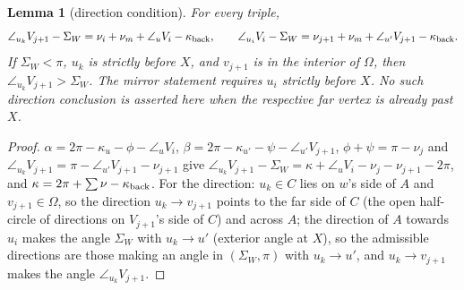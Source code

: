 \documentclass[11pt]{article}
\newtheorem{lemma}{Lemma}
\theoremstyle{definition}
\theoremstyle{remark}
\begin{document}
\begin{lemma}[direction condition]\label{dircond}
For every triple,
\[
 \angle_{u_k}V_{j+1}-\Sigma_W=\nu_i+\nu_m+\angle_uV_i-\kappa_{\rm back},\qquad
 \angle_{u_i}V_i-\Sigma_W=\nu_{j+1}+\nu_m+\angle_{u'}V_{j+1}-\kappa_{\rm back}.
\]
If $\Sigma_W<\pi$, $u_k$ is strictly before $X$, and $v_{j+1}$ is in the
interior of $\Omega$, then $\angle_{u_k}V_{j+1}>\Sigma_W$. The mirror statement
requires $u_i$ strictly before $X$. No such direction conclusion is asserted
here when the respective far vertex is already past $X$.
\end{lemma}
\begin{proof}
$\alpha=2\pi-\kappa_u-\phi-\angle_uV_i$, $\beta=2\pi-\kappa_{u'}-\psi-\angle_{u'}V_{j+1}$, $\phi+\psi=\pi-\nu_j$ and
$\angle_{u_k}V_{j+1}=\pi-\angle_{u'}V_{j+1}-\nu_{j+1}$ give
$\angle_{u_k}V_{j+1}-\Sigma_W=\kappa+\angle_uV_i-\nu_j-\nu_{j+1}-2\pi$, and $\kappa=2\pi+\sum\nu-\kappa_{\rm back}$.
For the direction: $u_k\in C$ lies on $w$'s side of $A$ and $v_{j+1}\in\Omega$, so the direction $u_k\to v_{j+1}$
points to the far side of $C$ (the open half-circle of directions on $V_{j+1}$'s side of $C$) and across $A$; the
direction of $A$ towards $u_i$ makes the angle $\Sigma_W$ with $u_k\to u'$ (exterior angle at $X$), so the
admissible directions are those making an angle in $(\Sigma_W,\pi)$ with $u_k\to u'$, and $u_k\to v_{j+1}$ makes
the angle $\angle_{u_k}V_{j+1}$.
\end{proof}
\end{document}
